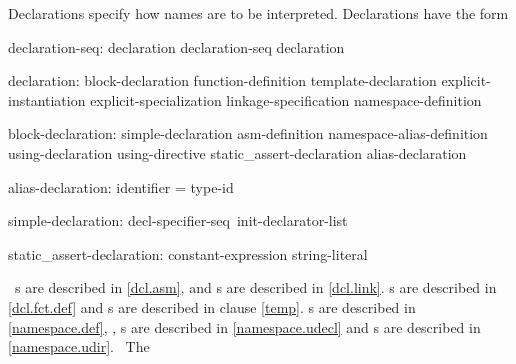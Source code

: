 \documentclass[american]{book}
\begin{document}
\begin{paras}

\pnum
{}%
Declarations specify how names are to be interpreted.
Declarations have the form

\begin{bnf}
%
declaration-seq:\br
        declaration\br
        declaration-seq declaration
\end{bnf}

\begin{bnf}
declaration:\br
        block-declaration\br
        function-definition\br
        template-declaration\br
        explicit-instantiation\br
        explicit-specialization\br
        linkage-specification\br
        namespace-definition\br
        \br
\end{bnf}

\begin{bnf}
block-declaration:\br
        simple-declaration\br
        asm-definition\br
        namespace-alias-definition\br
        using-declaration\br
        using-directive\br
        static_assert-declaration\br
        alias-declaration
\end{bnf}

\begin{bnf}
alias-declaration:\br
         identifier = type-id

simple-declaration:\br
        decl-specifier-seq\opt\ init-declarator-list\opt\ \terminal{;}

%
static_assert-declaration:\br
   \terminal{(} constant-expression \terminal{,} string-literal \terminal{)} \terminal{;}
\end{bnf}

\enternote\ 
s
are described in \ref{dcl.asm}, and
s
are described in \ref{dcl.link}.
s
are described in \ref{dcl.fct.def} and
s
are described in clause \ref{temp}.
s
are described in \ref{namespace.def},
,
s
are described in \ref{namespace.udecl} and
s
are described in \ref{namespace.udir}.
\exitnote\ 
The
\ 


\end{paras}
\end{document}
